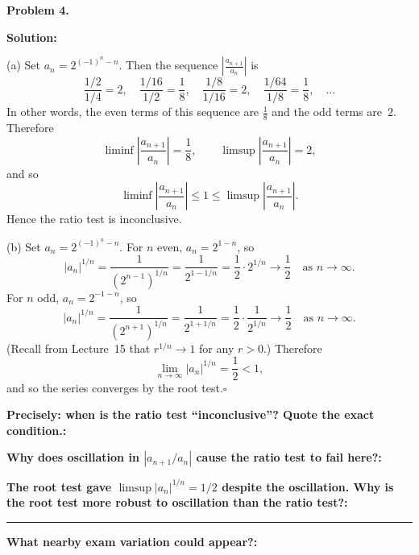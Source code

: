 \documentclass[12pt]{article}
\newcommand{\fillfield}[1]{%
  \par\noindent\textbf{#1:}\enspace\hrulefill\par\vspace{3pt}%
}
\newcommand{\fillfieldlong}[1]{%
  \par\noindent\textbf{#1:}\par\vspace{1.5cm}%
  \noindent\rule{\linewidth}{0.35pt}\par\vspace{4pt}%
}
\begin{document}
\newpage

\begin{tcolorbox}[
  enhanced, breakable,
  colback  = solgreen,
  colframe = green!45!black,
  fonttitle = \bfseries,
  title = {\textsc{Official Solution}\hfill Homework 7 -- Solutions}
]
\textbf{Problem 4.}

\medskip\textbf{Solution:}

\medskip
(a) Set $a_n = 2^{(-1)^n-n}$.
Then the sequence $\left|\frac{a_{n+1}}{a_n}\right|$ is
\[
  \frac{1/2}{1/4} = 2,\quad \frac{1/16}{1/2} = \frac{1}{8},\quad
  \frac{1/8}{1/16} = 2,\quad \frac{1/64}{1/8} = \frac{1}{8},\quad \ldots
\]
In other words, the even terms of this sequence are $\frac{1}{8}$ and the odd terms are~$2$.
Therefore
\[
  \liminf\left|\frac{a_{n+1}}{a_n}\right| = \frac{1}{8},
  \qquad
  \limsup\left|\frac{a_{n+1}}{a_n}\right| = 2,
\]
and so
\[
  \liminf\left|\frac{a_{n+1}}{a_n}\right| \leq 1 \leq \limsup\left|\frac{a_{n+1}}{a_n}\right|.
\]
Hence the ratio test is inconclusive.

\medskip
(b) Set $a_n = 2^{(-1)^n-n}$.
For $n$ even, $a_n = 2^{1-n}$, so
\[
  |a_n|^{1/n}
  = \frac{1}{(2^{n-1})^{1/n}}
  = \frac{1}{2^{1-1/n}}
  = \frac{1}{2}\cdot 2^{1/n}
  \to \frac{1}{2} \quad\text{as } n\to\infty.
\]
For $n$ odd, $a_n = 2^{-1-n}$, so
\[
  |a_n|^{1/n}
  = \frac{1}{(2^{n+1})^{1/n}}
  = \frac{1}{2^{1+1/n}}
  = \frac{1}{2}\cdot\frac{1}{2^{1/n}}
  \to \frac{1}{2} \quad\text{as } n\to\infty.
\]
(Recall from Lecture~15 that $r^{1/n} \to 1$ for any $r > 0$.)
Therefore
\[
  \lim_{n\to\infty}|a_n|^{1/n} = \frac{1}{2} < 1,
\]
and so the series converges by the root test.\hfill$\square$
\end{tcolorbox}

\bigskip

\begin{tcolorbox}[
  enhanced, breakable,
  colback  = reflectcyan,
  colframe = cyan!55!black,
  fonttitle = \bfseries,
  title = {\textsc{Reflection \& Variation}}
]
\fillfield{Precisely: when is the ratio test ``inconclusive''? Quote the exact condition.}
\fillfield{Why does oscillation in $|a_{n+1}/a_n|$ cause the ratio test to fail here?}
\fillfieldlong{The root test gave $\limsup|a_n|^{1/n} = 1/2$ despite the oscillation. Why is the root test more robust to oscillation than the ratio test?}
\fillfield{What nearby exam variation could appear?}
\end{tcolorbox}

\newpage
\end{document}
